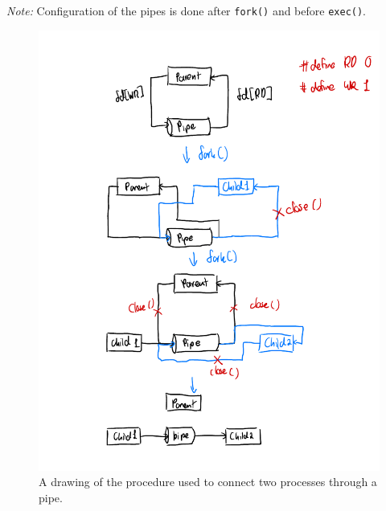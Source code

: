 \documentclass[12pt]{article}
\begin{document}
\textit{Note:} Configuration of the pipes is done after
\texttt{fork()} and before \texttt{exec()}.



\begin{figure}[H]
\centering
\includegraphics{task1qb}
\caption{A drawing of the procedure used to connect two processes
through a pipe.}
\end{figure}
\end{document}

